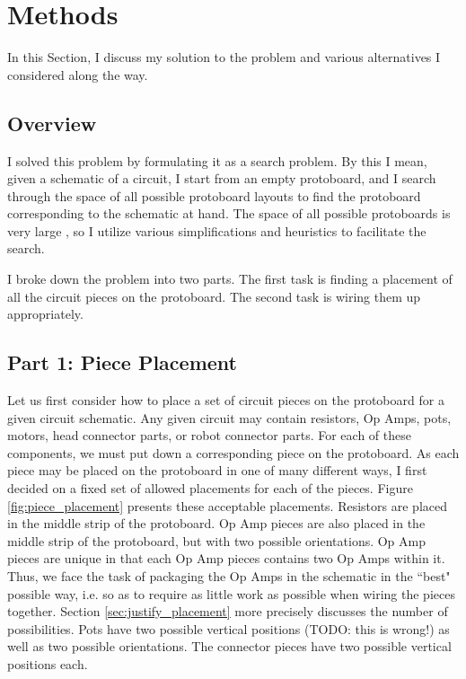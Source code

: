 
\chapter{Methods}
\label{ch:methods}

In this Section, I discuss my solution to the problem and various alternatives I
considered along the way.

\section{Overview}

I solved this problem by formulating it as a search problem. By this I mean,
given a schematic of a circuit, I start from an empty protoboard, and I search
through the space of all possible protoboard layouts to find the protoboard
corresponding to the schematic at hand. The space of all possible protoboards is
very large \q, so I utilize various simplifications
and heuristics to facilitate the search.

I broke down the problem into two parts. The first task is finding a placement
of all the circuit pieces on the protoboard. The second task is wiring them up
appropriately.

\section{Part 1: Piece Placement}
\label{sec:placement}

Let us first consider how to place a set of circuit pieces on the protoboard for
a given circuit schematic. Any given circuit may contain resistors, Op Amps,
pots, motors, head connector parts, or robot connector parts. For each of these
components, we must put down a corresponding piece on the protoboard. As each
piece may be placed on the protoboard in one of many different ways, I first
decided on a fixed set of allowed placements for each of the pieces. Figure
\ref{fig:piece_placement} presents these acceptable placements.
Resistors are placed in the middle strip of the protoboard. Op Amp pieces are
also placed in the middle strip of the protoboard, but with two possible
orientations. Op Amp pieces are unique in that each Op Amp pieces contains two
Op Amps within it. Thus, we face the task of packaging the Op Amps in the
schematic in the ``best" possible way, i.e. so as to require as little work as
possible when wiring the pieces together. Section \ref{sec:justify_placement}
more precisely discusses the number of possibilities. Pots have two possible
vertical positions (TODO: this is wrong!) as well as two possible orientations.
The connector pieces have two possible vertical positions each.

